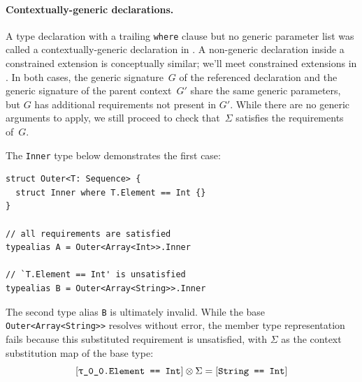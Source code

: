 \documentclass[../generics]{subfiles}
\begin{document}
\paragraph{Contextually-generic declarations.}
A type declaration with a trailing \texttt{where} clause but no generic parameter list was called a contextually-generic declaration in . A non-generic declaration inside a constrained extension is conceptually similar; we'll meet constrained extensions in . In both cases, the generic signature~$G$ of the referenced declaration and the generic signature of the parent context~$G'$ share the same generic parameters, but $G$ has additional requirements not present in $G'$. While there are no generic arguments to apply, we still proceed to check that~$\Sigma$ satisfies the requirements of~$G$.
\begin{example}
The \texttt{Inner} type below demonstrates the first case:
\begin{Verbatim}
struct Outer<T: Sequence> {
  struct Inner where T.Element == Int {}
}

// all requirements are satisfied
typealias A = Outer<Array<Int>>.Inner

// `T.Element == Int' is unsatisfied
typealias B = Outer<Array<String>>.Inner
\end{Verbatim}
The second type alias \texttt{B} is ultimately invalid. While the base \texttt{Outer<Array<String>>} resolves without error, the member type representation fails because this substituted requirement is unsatisfied, with $\Sigma$ as the context substitution map of the base type:
\[\SameReq{\rT.Element}{Int}\otimes\Sigma=\SameReq{String}{Int}\]
\end{example}
\end{document}
